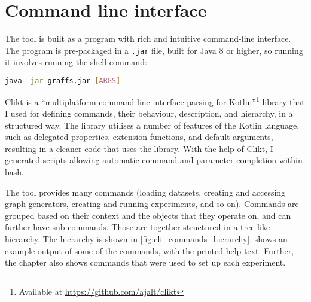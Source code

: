 \section{Command line interface}\label{sec:cli}

The \graffs tool is built as a program with rich and intuitive command-line interface.
The program is pre-packaged in a \texttt{.jar} file, built for Java 8 or higher, so running it involves running the shell command:
\begin{lstlisting}[language=bash,style=light]
java -jar graffs.jar [ARGS]
\end{lstlisting}

Clikt is a \enquote{multiplatform command line interface parsing for Kotlin}\footnote{Available at \url{https://github.com/ajalt/clikt}} library that I used for defining commands, their behaviour, description, and hierarchy, in a structured way.
The library utilises a number of features of the Kotlin language, such as delegated properties, extension functions, and default arguments, resulting in a cleaner code that uses the library.
With the help of Clikt, I generated scripts allowing automatic command and parameter completion within bash.

The \graffs tool provides many commands (loading datasets, creating and accessing graph generators, creating and running experiments, and so on).
Commands are grouped based on their context and the objects that they operate on, and can further have sub-commands.
Those are together structured in a tree-like hierarchy.
The hierarchy is shown in \autoref{fig:cli_commands_hierarchy}.
 shows an example output of some of the commands, with the printed help text.
Further, the  chapter also shows commands that were used to set up each experiment.


